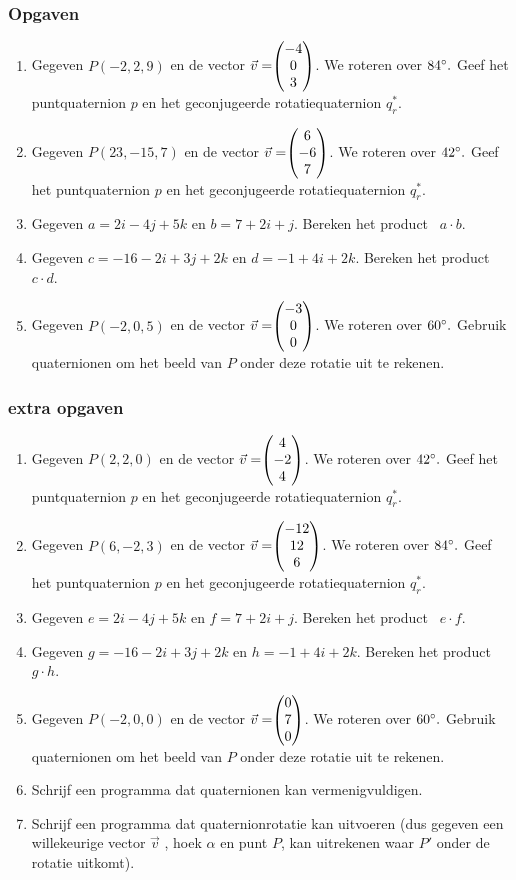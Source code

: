 \subsubsection{Opgaven}
\begin{enumerate}
	\item Gegeven $ P (-2, 2, 9) $ en de vector $\vec{v} = \vecdrie{-4}{0}{3} $. 
	We roteren over $ 84\degree. $ Geef het puntquaternion $p$ en het geconjugeerde rotatiequaternion  $  q_r^* $.
	\item Gegeven $ P (23, -15, 7) $ en de vector $\vec{v} = \vecdrie{6}{-6}{7} $. 
	We roteren over $ 42\degree. $ Geef het puntquaternion $p$ en het geconjugeerde rotatiequaternion  $  q_r^* $.
	
	\item Gegeven $ a = 2i-4j+5k$ en   $ b = 7+2i+j $. 
	Bereken het product \ $  a\cdot b $.
	\item Gegeven $ c = -16 -2i+3j+2k $ en   $ d = -1+4i+2k $. 
	Bereken het product \ $  c\cdot d $.
	
	\item Gegeven $ P (-2, 0, 5) $ en de vector $\vec{v} = \vecdrie{-3}{0}{0} $. 
	We roteren over $ 60\degree. $ Gebruik quaternionen om het beeld van $P$ onder deze rotatie uit te rekenen.
\end{enumerate}

\subsubsection{extra opgaven}
\begin{enumerate}
	\item Gegeven $ P (2,2,0) $ en de vector $\vec{v} = \vecdrie{4}{-2}{4} $. 
	We roteren over $ 42\degree. $ Geef het puntquaternion $p$ en het geconjugeerde rotatiequaternion  $  q_r^* $. 
	
	\item Gegeven $ P (6,-2,3) $ en de vector $\vec{v} = \vecdrie{-12}{12}{6} $. 
	We roteren over $ 84\degree. $ Geef het puntquaternion $p$ en het geconjugeerde rotatiequaternion  $  q_r^* $. 
	
	\item Gegeven $ e = 2i-4j+5k$ en   $ f = 7+2i+j $. 
	Bereken het product \ $  e\cdot f $.
	
	\item Gegeven $ g = -16 -2i+3j+2k $ en   $ h = -1+4i+2k $. 
	Bereken het product \ $  g\cdot h $.
	
	\item  Gegeven $ P (-2, 0, 0) $ en de vector $\vec{v} = \vecdrie{0}{7}{0} $. 
	We roteren over $ 60\degree. $ Gebruik quaternionen om het beeld van $P$ onder deze rotatie uit te rekenen.   
	
	\item Schrijf een programma dat quaternionen kan vermenigvuldigen.   
	
	\item Schrijf een programma dat quaternionrotatie kan uitvoeren (dus gegeven een willekeurige vector $\vec{v} $ , hoek $ \alpha $ en punt $P$, kan uitrekenen waar $P'$ onder de rotatie uitkomt).      
	
\end{enumerate}


